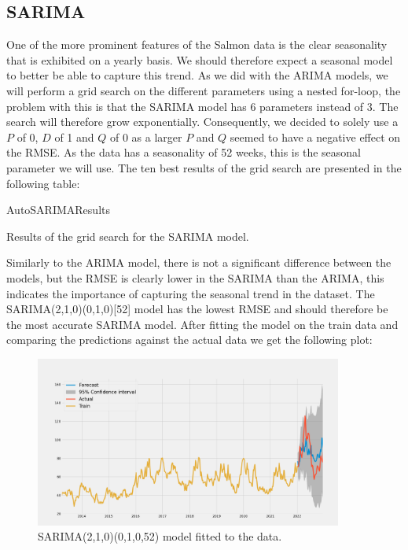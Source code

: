 \subsection{SARIMA}\label{sec:sarima}
One of the more prominent features of the Salmon data is the clear seasonality that is exhibited on a yearly basis. We should therefore expect a seasonal model to better be able to capture this trend. As we did with the ARIMA models, we will perform a grid search on the different parameters using a nested for-loop, the problem with this is that the SARIMA model has 6 parameters instead of 3. The search will therefore grow exponentially. Consequently, we decided to solely use a $P$ of 0, $D$ of 1 and $Q$ of 0 as a larger $P$ and $Q$ seemed to have a negative effect on the RMSE. As the data has a seasonality of 52 weeks, this is the seasonal parameter we will use. The ten best results of the grid search are presented in the following table:
\begin{table}[H]
    \begin{center}
        {AutoSARIMAResults}
        \caption{Results of the grid search for the SARIMA model.}\label{tab:SARIMAResults}
    \end{center}
\end{table}
Similarly to the ARIMA model, there is not a significant difference between the models, but the RMSE is clearly lower in the SARIMA than the ARIMA, this indicates the importance of capturing the seasonal trend in the dataset. The SARIMA(2,1,0)(0,1,0)[52] model has the lowest RMSE and should therefore be the most accurate SARIMA model. After fitting the model on the train data and comparing the predictions against the actual data we get the following plot:
\begin{figure}[H]
    \begin{center}
        \includegraphics[width=0.9\textwidth]{data/Figures/ARIMA/SARIMA_2_1_0_0_1_0_52.png}
        \caption{SARIMA(2,1,0)(0,1,0,52) model fitted to the data.}\label{fig:SARIMA_21001052}
    \end{center}
\end{figure}
